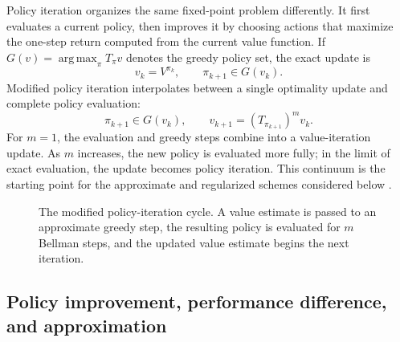 Policy iteration organizes the same fixed-point problem differently. It first
evaluates a current policy, then improves it by choosing actions that maximize
the one-step return computed from the current value function. If
$G(v)=\operatorname*{arg\,max}_{\pi}T_\pi v$ denotes the greedy policy set,
the exact update is
\begin{equation}
    v_k=V^{\pi_k},
    \qquad
    \pi_{k+1}\in G(v_k).
    \label{eq:rl-policy-iteration}
\end{equation}
Modified policy iteration interpolates between a single optimality update and
complete policy evaluation:
\begin{equation}
    \pi_{k+1}\in G(v_k),
    \qquad
    v_{k+1}=(T_{\pi_{k+1}})^m v_k.
    \label{eq:rl-modified-policy-iteration}
\end{equation}
For $m=1$, the evaluation and greedy steps combine into a value-iteration
update. As $m$ increases, the new policy is evaluated more fully; in the limit
of exact evaluation, the update becomes policy iteration. This continuum is the
starting point for the approximate and regularized schemes considered below
\parencite{scherrer2014approximate,geist2019regularized}.

\begin{figure}[htbp]
    \centering
    \resizebox{\textwidth}{!}{}
    \caption{The modified policy-iteration cycle. A value estimate is passed to
    an approximate greedy step, the resulting policy is evaluated for $m$
    Bellman steps, and the updated value estimate begins the next iteration.}
    \label{fig:rl-policy-iteration}
\end{figure}

\subsection{Policy improvement, performance difference, and approximation}
\label{subsec:rl-policy-improvement-approximation}

